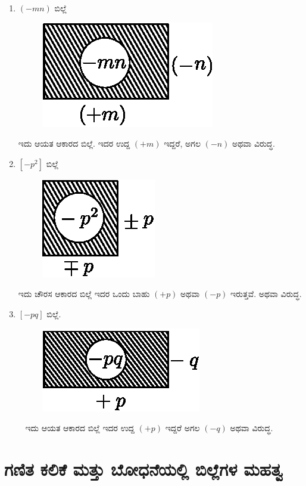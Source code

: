 \begin{enumerate}
\eject

\item $(-mn)$ ಬಿಲ್ಲೆ 
\begin{figure}[H]
\centering
\includegraphics[scale=0.8]{src/figure/chap3/fig3-5d.eps}
\end{figure}
ಇದು ಆಯತ ಆಕಾರದ ಬಿಲ್ಲೆ. ಇದರ ಉದ್ದ $(+m)$ ಇದ್ದರೆ, ಅಗಲ $(-n)$ ಅಥವಾ ವಿರುದ್ಧ. 

\item $[-p^2]$ ಬಿಲ್ಲೆ 
\begin{figure}[H]
\centering
\includegraphics[scale=0.8]{src/figure/chap3/fig3-5e.eps}
\end{figure}
ಇದು ಚೌರಸ ಆಕಾರದ ಬಿಲ್ಲೆ ಇದರ ಒಂದು ಬಾಹು $(+p)$ ಅಥವಾ $(-p)$ ಇರುತ್ತವೆ. ಅಥವಾ ವಿರುದ್ಧ.

\item $[-pq]$ ಬಿಲ್ಲೆ. 
~
\vskip -0.3cm
\begin{figure}[H]
\centering
\includegraphics[scale=0.8]{src/figure/chap3/fig3-5f.eps}
\end{figure}
~
\vskip -0.3cm
ಇದು ಆಯತ ಆಕಾರದ ಬಿಲ್ಲೆ ಇದರ ಉದ್ದ $(+p)$ ಇದ್ದರೆ ಅಗಲ $(-q)$ ಅಥವಾ ವಿರುದ್ಧ. 
\end{enumerate}

\section*{ಗಣಿತ ಕಲಿಕೆ ಮತ್ತು ಬೋಧನೆಯಲ್ಲಿ ಬಿಲ್ಲೆಗಳ ಮಹತ್ವ}

